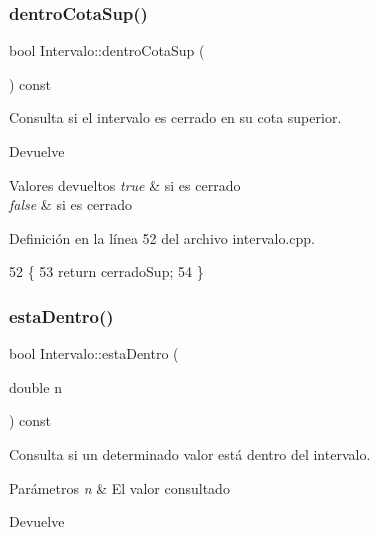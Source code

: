 \subsubsection{\texorpdfstring{dentro\+Cota\+Sup()}{dentroCotaSup()}}
{\footnotesize\ttfamily bool Intervalo\+::dentro\+Cota\+Sup (\begin{DoxyParamCaption}{ }\end{DoxyParamCaption}) const}



Consulta si el intervalo es cerrado en su cota superior. 

\begin{DoxyReturn}{Devuelve}

\end{DoxyReturn}

\begin{DoxyRetVals}{Valores devueltos}
{\em true} & si es cerrado \\
\hline
{\em false} & si es cerrado \\
\hline
\end{DoxyRetVals}


Definición en la línea 52 del archivo intervalo.\+cpp.


\begin{DoxyCode}
52                                    \{
53     \textcolor{keywordflow}{return} cerradoSup;
54 \}
\end{DoxyCode}
\mbox{\label{classIntervalo_a2cccd9264f1b3912c6006fe3e2a70289}} 
\subsubsection{\texorpdfstring{esta\+Dentro()}{estaDentro()}}
{\footnotesize\ttfamily bool Intervalo\+::esta\+Dentro (\begin{DoxyParamCaption}\item[{double}]{n }\end{DoxyParamCaption}) const}



Consulta si un determinado valor está dentro del intervalo. 


\begin{DoxyParams}{Parámetros}
{\em n} & El valor consultado \\
\hline
\end{DoxyParams}
\begin{DoxyReturn}{Devuelve}

\end{DoxyReturn}

